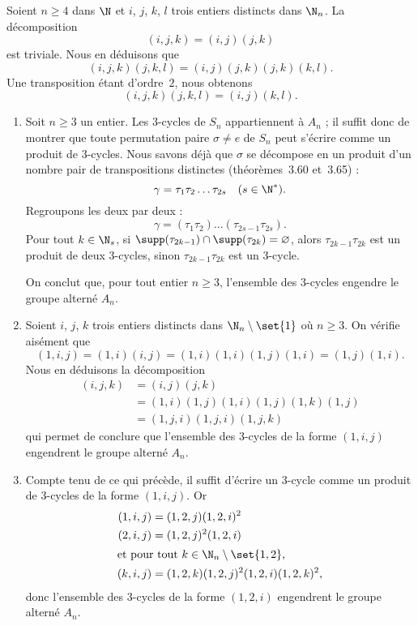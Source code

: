 
Soient $n\geq 4$ dans $\N$ et $i$, $j$, $k$, $l$ trois entiers distincts dans $\N_n$.
La décomposition
\[
  (i, j, k) = (i, j)(j, k)
\]
est triviale.
Nous en déduisons que
\[
  (i, j, k)(j, k, l) = (i, j)(j, k)(j, k)(k, l).
\]
Une transposition étant d'ordre~$2$, nous obtenons
\[
  (i, j, k)(j, k, l) = (i, j)(k, l).
\]
\begin{enumerate}
  \item %
    Soit $n\geq 3$ un entier.
    Les $3$-cycles de $S_n$ appartiennent à $A_n$ ;
    il suffit donc de montrer que toute permutation paire $\sigma\neq e$ de $S_n$ peut s'écrire comme un produit de $3$-cycles.
    Nous savons déjà que $\sigma$ se décompose en un produit d'un nombre pair de transpositions distinctes (théorèmes~3.60 et~3.65) :
    \[
      \gamma = \tau_1\tau_2\dots\tau_{2s} \quad (s\in\N^*).
    \]
    Regroupons les deux par deux :
    \[
      \gamma = (\tau_1\tau_2)\dots (\tau_{2s - 1}\tau_{2s}).
    \]
    Pour tout $k\in\N_s$, si $\supp(\tau_{2k - 1})\cap \supp(\tau_{2k}) = \varnothing$, alors $\tau_{2k - 1}\tau_{2k}$ est un produit de deux $3$-cycles, sinon $\tau_{2k - 1}\tau_{2k}$ est un $3$-cycle.

    On conclut que, pour tout entier $n\geq 3$, l'ensemble des $3$-cycles engendre le groupe alterné $A_n$.

  \item %
    Soient $i$, $j$, $k$ trois entiers distincts dans $\N_n\setminus\set{1}$ où $n\geq 3$.
    On vérifie aisément que
    \[
      (1, i, j) = (1, i)(i, j) = (1, i)(1, i)(1, j)(1, i) = (1, j)(1, i).
    \]
    Nous en déduisons la décomposition
    \begin{align*}
      (i, j, k)
        &= (i, j)(j, k) \\
        &= (1, i)(1, j)(1, i)(1, j)(1, k)(1, j) \\
        &= (1, j, i)(1, j, i)(1, j, k)
    \end{align*}
    qui permet de conclure que l'ensemble des $3$-cycles de la forme $(1, i, j)$ engendrent le groupe alterné $A_n$.

  \item %
    Compte tenu de ce qui précède, il suffit d'écrire un $3$-cycle comme un produit de $3$-cycles de la forme $(1, i, j)$.
    Or
    \begin{align*}
      (1, i, j) &= (1, 2, j)(1, 2, i)^2  \\
      (2, i, j) &= (1, 2, j)^2 (1, 2, i) \\
      \shortintertext{et pour tout $k\in\N_n\setminus\set{1, 2}$, }
      (k, i, j) &= (1, 2, k)(1, 2, j)^2(1, 2, i)(1, 2, k)^2,
    \end{align*}
    donc l'ensemble des $3$-cycles de la forme $(1, 2, i)$ engendrent le groupe alterné $A_n$.
\end{enumerate}
